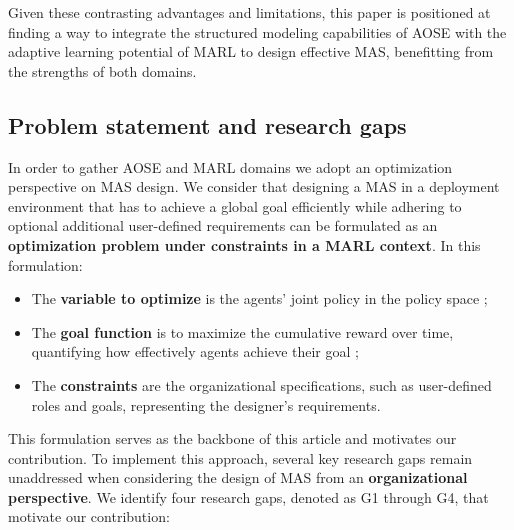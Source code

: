\documentclass[pdflatex,sn-mathphys-num]{sn-jnl}%
\theoremstyle{thmstyleone}%
\theoremstyle{thmstyletwo}%
\theoremstyle{thmstylethree}%
\begin{document}
Given these contrasting advantages and limitations, this paper is positioned at finding a way to integrate the structured modeling capabilities of AOSE with the adaptive learning potential of MARL to design effective MAS, benefitting from the strengths of both domains.


\subsection{Problem statement and research gaps}

In order to gather AOSE and MARL domains we adopt an optimization perspective on MAS design. We consider that designing a MAS in a deployment environment that has to achieve a global goal efficiently while adhering to optional additional user-defined requirements can be formulated as an \textbf{optimization problem under constraints in a MARL context}. In this formulation:
\begin{itemize}
    \item The \textbf{variable to optimize} is the agents' joint policy in the policy space ;
    \item The \textbf{goal function} is to maximize the cumulative reward over time, quantifying how effectively agents achieve their goal ;
    \item The \textbf{constraints} are the organizational specifications, such as user-defined roles and goals, representing the designer's requirements.
\end{itemize}
This formulation serves as the backbone of this article and motivates our contribution. 
%
To implement this approach, several key research gaps remain unaddressed when considering the design of MAS from an \textbf{organizational perspective}. We identify four research gaps, denoted as G1 through G4, that motivate our contribution:
%
\end{document}
